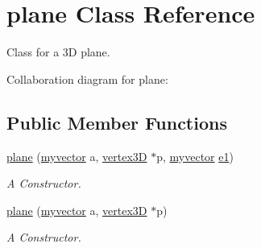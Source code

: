 \hypertarget{classplane}{}\section{plane Class Reference}
\label{classplane}


Class for a 3D plane.  




Collaboration diagram for plane\+:
\subsection*{Public Member Functions}
\begin{DoxyCompactItemize}
\item 
\hyperlink{classplane_ab506ee0963b2469308760cad533b2539}{plane} (\hyperlink{classmyvector}{myvector} a, \hyperlink{classvertex3D}{vertex3D} $\ast$p, \hyperlink{classmyvector}{myvector} \hyperlink{classplane_a8edd6c4f34e5caae715c1f08b9898830}{e1})
\begin{DoxyCompactList}\small\item\em A Constructor. \end{DoxyCompactList}\item 
\hyperlink{classplane_a3f20707cf6b495058c537235a80c2ab8}{plane} (\hyperlink{classmyvector}{myvector} a, \hyperlink{classvertex3D}{vertex3D} $\ast$p)
\begin{DoxyCompactList}\small\item\em A Constructor. \end{DoxyCompactList}\end{DoxyCompactItemize}
